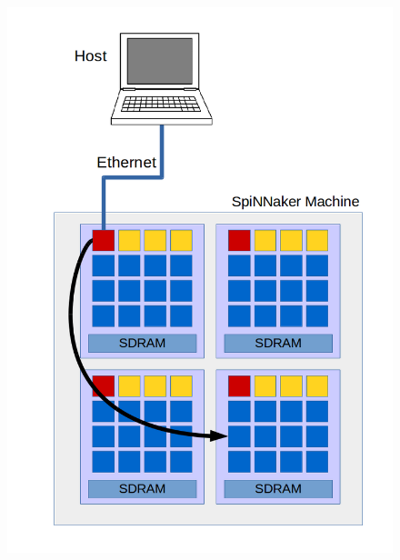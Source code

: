 \begin{figure}
\begin{minipage}{.32\textwidth}
  \includegraphics[width=1\linewidth, natwidth=794, natheight=1123]{images/put2.png}
  \label{fig:root-leaf}
\end{minipage}
\begin{minipage}{.32\textwidth}
  \centering

\end{minipage}
\end{figure}
